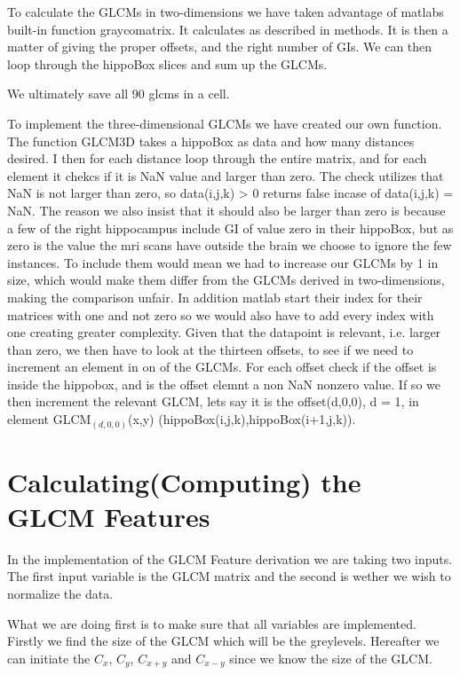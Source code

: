 To calculate the GLCMs in two-dimensions we have taken advantage of matlabs built-in function graycomatrix. It calculates as described in methods. It is then a matter of giving the proper offsets, and the right number of GIs. We can then loop through the hippoBox slices and sum up the GLCMs.

We ultimately save all 90 glcms in a cell.

To implement the three-dimensional GLCMs we have created our own function.
The function GLCM3D takes a hippoBox as data and how many distances desired. I then for each distance loop through the entire matrix, and for each element it chekcs if it is NaN value and larger than zero. The check utilizes that NaN is not larger than zero, so data(i,j,k) > 0 returns false incase of data(i,j,k) = NaN.
The reason we also insist that it should also be larger than zero is because a few of the right hippocampus include GI of value zero in their hippoBox, but as zero is the value the mri scans have outside the brain we choose to ignore the few instances. To include them would mean we had to increase our GLCMs by 1 in size, which would make them differ from the GLCMs derived in two-dimensions, making the comparison unfair. In addition matlab start their index for their matrices with one and not zero so we would also have to add every index with one creating greater complexity.
Given that the datapoint is relevant, i.e. larger than zero, we then have to look at the thirteen offsets, to see if we need to increment an element in on of the GLCMs. For each offset check if the offset is inside the hippobox, and is the offset elemnt a non NaN nonzero value. If so we then increment the relevant GLCM, lets say it is the offset(d,0,0), d = 1, in element GLCM$_(d,0,0)$(x,y) (hippoBox(i,j,k),hippoBox(i+1,j,k)).


\section{Calculating(Computing) the GLCM Features}

In the implementation of the GLCM Feature derivation we are taking two inputs. The first input variable is the GLCM matrix and the second is wether we wish to normalize the data.

What we are doing first is to make sure that all variables are implemented. Firstly we find the size of the GLCM which will be the greylevels. Hereafter we can initiate the $C_x$, $C_y$, $C_{x+y}$ and $C_{x-y}$ since we know the size of the GLCM.

